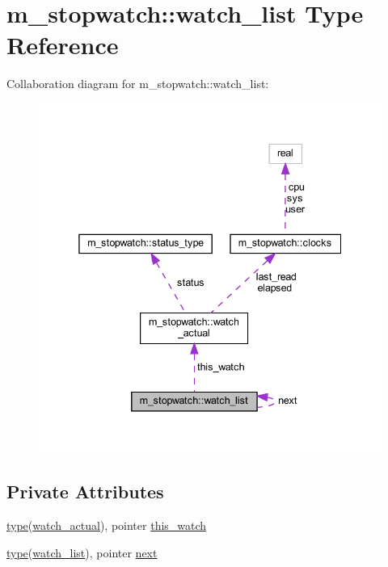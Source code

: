 \hypertarget{structm__stopwatch_1_1watch__list}{}\section{m\+\_\+stopwatch\+:\+:watch\+\_\+list Type Reference}
\label{structm__stopwatch_1_1watch__list}


Collaboration diagram for m\+\_\+stopwatch\+:\+:watch\+\_\+list\+:
\nopagebreak
\begin{figure}[H]
\begin{center}
\leavevmode
\includegraphics[width=338pt]{structm__stopwatch_1_1watch__list__coll__graph}
\end{center}
\end{figure}
\subsection*{Private Attributes}
\begin{DoxyCompactItemize}
\item 
\hyperlink{stop__watch_83_8txt_a70f0ead91c32e25323c03265aa302c1c}{type}(\hyperlink{structm__stopwatch_1_1watch__actual}{watch\+\_\+actual}), pointer \hyperlink{structm__stopwatch_1_1watch__list_ac8234d58cf4e9e41c2debff4c807f461}{this\+\_\+watch}
\item 
\hyperlink{stop__watch_83_8txt_a70f0ead91c32e25323c03265aa302c1c}{type}(\hyperlink{structm__stopwatch_1_1watch__list}{watch\+\_\+list}), pointer \hyperlink{structm__stopwatch_1_1watch__list_a898fce86de28e07bf5f627baf40f35f0}{next}
\end{DoxyCompactItemize}


